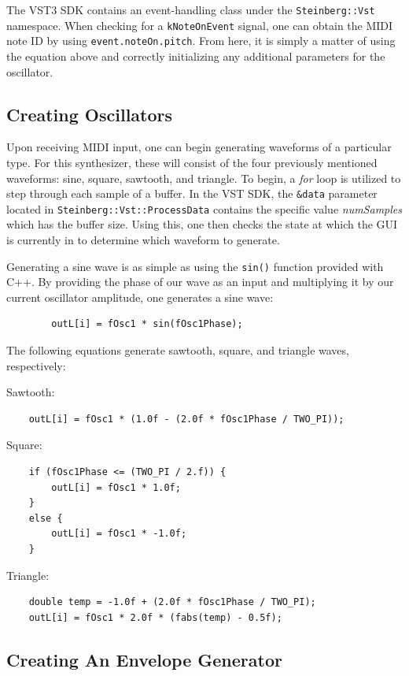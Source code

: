 \documentclass[12pt]{article}
\begin{document}
The VST3 SDK contains an event-handling class under the \verb*|Steinberg::Vst| namespace. When checking for a \verb|kNoteOnEvent| signal, one can obtain the MIDI note ID by using \verb*|event.noteOn.pitch|. From here, it is simply a matter of using the equation above and correctly initializing any additional parameters for the oscillator. 

\subsection{Creating Oscillators}
Upon receiving MIDI input, one can begin generating waveforms of a particular type. For this synthesizer, these will consist of the four previously mentioned waveforms: sine, square, sawtooth, and triangle. To begin, a \textit{for} loop is utilized to step through each sample of a buffer. In the VST SDK, the \verb*|&data| parameter located in \verb*|Steinberg::Vst::ProcessData| contains the specific value \textit{numSamples} which has the buffer size. Using this, one then checks the state at which the GUI is currently in to determine which waveform to generate.

Generating a sine wave is as simple as using the \verb*|sin()| function provided with C++. By providing the phase of our wave as an input and multiplying it by our current oscillator amplitude, one generates a sine wave:

\begin{lstlisting}
		outL[i] = fOsc1 * sin(fOsc1Phase);
\end{lstlisting} 

The following equations generate sawtooth, square, and triangle waves, respectively:

Sawtooth:
\begin{lstlisting}
	outL[i] = fOsc1 * (1.0f - (2.0f * fOsc1Phase / TWO_PI));
\end{lstlisting} 

Square:
\begin{lstlisting}
	if (fOsc1Phase <= (TWO_PI / 2.f)) {
		outL[i] = fOsc1 * 1.0f;
	}
	else {
		outL[i] = fOsc1 * -1.0f;
	}
\end{lstlisting} 

Triangle:
\begin{lstlisting}
	double temp = -1.0f + (2.0f * fOsc1Phase / TWO_PI);
	outL[i] = fOsc1 * 2.0f * (fabs(temp) - 0.5f);
\end{lstlisting} 


\subsection{Creating An Envelope Generator}
\end{document}
